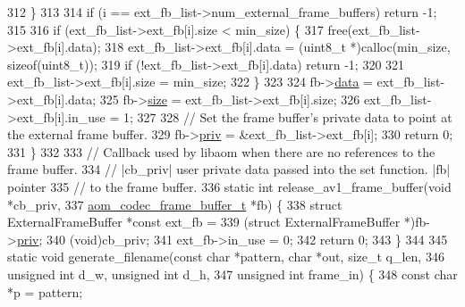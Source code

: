 \begin{DoxyCodeInclude}
{{{{{{{{312   \}
313 
314   \textcolor{keywordflow}{if} (i == ext\_fb\_list->num\_external\_frame\_buffers) \textcolor{keywordflow}{return} -1;
315 
316   \textcolor{keywordflow}{if} (ext\_fb\_list->ext\_fb[i].size < min\_size) \{
317     free(ext\_fb\_list->ext\_fb[i].data);
318     ext\_fb\_list->ext\_fb[i].data = (uint8\_t *)calloc(min\_size, \textcolor{keyword}{sizeof}(uint8\_t));
319     \textcolor{keywordflow}{if} (!ext\_fb\_list->ext\_fb[i].data) \textcolor{keywordflow}{return} -1;
320 
321     ext\_fb\_list->ext\_fb[i].size = min\_size;
322   \}
323 
324   fb->\hyperlink{structaom__codec__frame__buffer_a4b73719e1d6756516de8cbceb68822d2}{data} = ext\_fb\_list->ext\_fb[i].data;
325   fb->\hyperlink{structaom__codec__frame__buffer_a6fc24049c4e1706ce3a462825009f3d4}{size} = ext\_fb\_list->ext\_fb[i].size;
326   ext\_fb\_list->ext\_fb[i].in\_use = 1;
327 
328   \textcolor{comment}{// Set the frame buffer's private data to point at the external frame buffer.}
329   fb->\hyperlink{structaom__codec__frame__buffer_aa689f8e27421eebc9e1c70b607e415ef}{priv} = &ext\_fb\_list->ext\_fb[i];
330   \textcolor{keywordflow}{return} 0;
331 \}
332 
333 \textcolor{comment}{// Callback used by libaom when there are no references to the frame buffer.}
334 \textcolor{comment}{// |cb\_priv| user private data passed into the set function. |fb| pointer}
335 \textcolor{comment}{// to the frame buffer.}
336 \textcolor{keyword}{static} \textcolor{keywordtype}{int} release\_av1\_frame\_buffer(\textcolor{keywordtype}{void} *cb\_priv,
337                                     \hyperlink{structaom__codec__frame__buffer}{aom\_codec\_frame\_buffer\_t} *fb) \{
338   \textcolor{keyword}{struct }ExternalFrameBuffer *\textcolor{keyword}{const} ext\_fb =
339       (\textcolor{keyword}{struct }ExternalFrameBuffer *)fb->\hyperlink{structaom__codec__frame__buffer_aa689f8e27421eebc9e1c70b607e415ef}{priv};
340   (\textcolor{keywordtype}{void})cb\_priv;
341   ext\_fb->in\_use = 0;
342   \textcolor{keywordflow}{return} 0;
343 \}
344 
345 \textcolor{keyword}{static} \textcolor{keywordtype}{void} generate\_filename(\textcolor{keyword}{const} \textcolor{keywordtype}{char} *pattern, \textcolor{keywordtype}{char} *out, \textcolor{keywordtype}{size\_t} q\_len,
346                               \textcolor{keywordtype}{unsigned} \textcolor{keywordtype}{int} d\_w, \textcolor{keywordtype}{unsigned} \textcolor{keywordtype}{int} d\_h,
347                               \textcolor{keywordtype}{unsigned} \textcolor{keywordtype}{int} frame\_in) \{
348   \textcolor{keyword}{const} \textcolor{keywordtype}{char} *p = pattern;
}}}}}}}}
\end{DoxyCodeInclude}
